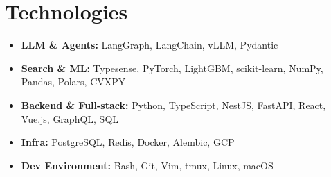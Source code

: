 \documentclass[10pt, a4paper]{article}
\newenvironment{highlights}{
    \begin{itemize}[
        topsep=1.5 pt,
        parsep=0pt,
        partopsep=0pt,
        itemsep=1.5 pt,
        leftmargin=12 pt
    ]
}{
    \end{itemize}
} %
\begin{document}
    \section{Technologies}
        \begin{highlights}
            \item \textbf{LLM \& Agents:} LangGraph, LangChain, vLLM, Pydantic
            \item \textbf{Search \& ML:} Typesense, PyTorch, LightGBM, scikit-learn, NumPy, Pandas, Polars, CVXPY
            \item \textbf{Backend \& Full-stack:} Python, TypeScript, NestJS, FastAPI, React, Vue.js, GraphQL, SQL
            \item \textbf{Infra:} PostgreSQL, Redis, Docker, Alembic, GCP
            \item \textbf{Dev Environment:} Bash, Git, Vim, tmux, Linux, macOS
        \end{highlights}
\end{document}
